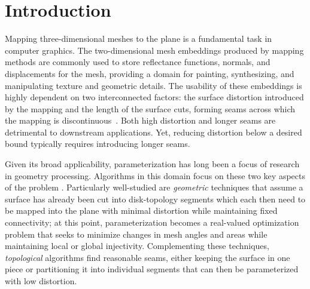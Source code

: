 
\section{Introduction}
Mapping three-dimensional meshes to the plane is a fundamental task in computer graphics.  The two-dimensional mesh embeddings produced by mapping methods are commonly used to store reflectance functions, normals, and displacements
for the mesh, providing a domain for painting, synthesizing, and manipulating texture and geometric details. 
%
The usability of these embeddings is highly dependent on two interconnected factors: the surface distortion introduced by the mapping and the length of the surface cuts, forming seams across which the mapping is discontinuous~\cite{Hormann2008}. Both high distortion and longer seams are detrimental to downstream applications. Yet, reducing distortion below a desired 
bound typically requires introducing longer seams. 

Given its broad applicability, parameterization has long been a focus of research in geometry processing. Algorithms in this domain focus on these two key aspects of the problem \cite{Sheffer07_ParameterizationSurvey}.  Particularly well-studied are \emph{geometric} techniques that assume a surface has already been cut into disk-topology segments %
 which each then need to be mapped into the plane with minimal distortion while maintaining fixed connectivity; at this point, parameterization becomes a real-valued optimization problem that seeks to minimize changes in mesh angles and areas while maintaining local or global injectivity. Complementing these techniques, \emph{topological} algorithms find reasonable seams, either keeping the surface in one piece or partitioning it into individual segments that can then be parameterized with low distortion. %

